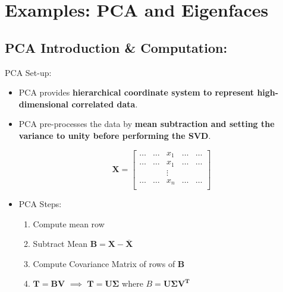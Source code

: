 \documentclass[9pt]{beamer}
\begin{document}
\section{Examples: PCA and Eigenfaces}
\subsection{PCA Introduction \& Computation:}

\begin{frame}{PCA Set-up:}
    \begin{itemize}
        \item PCA provides \textbf{hierarchical coordinate system to represent high-dimensional correlated data}.
        \item PCA pre-processes the data by \textbf{mean subtraction and setting the variance to unity before performing the SVD}.
        
        \begin{displaymath}
        \mathbf{X} = 
            \begin{bmatrix}
                \hdots & \hdots & x_{1} & \hdots & \hdots \\
                \hdots & \hdots & x_{1} & \hdots & \hdots \\
                 & & \vdots & & \\
                 \hdots & \hdots & x_{n} & \hdots & \hdots \\
            \end{bmatrix}
        \end{displaymath}
        
        \item PCA Steps:
        
        \begin{enumerate}
            \item Compute mean row 
            \item Subtract Mean $\mathbf{B = X - \overline{X}}$
            \item Compute Covariance Matrix of rows of $\mathbf{B}$
            \item $\mathbf{T = BV}$ $\implies$ $\mathbf{T = U\Sigma}$ where $B = \mathbf{U\Sigma V^{T}}$ \footnotemark
        \end{enumerate}
        
        
    \end{itemize}
\end{frame}
\end{document}
